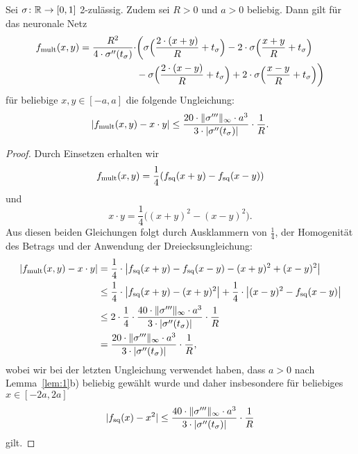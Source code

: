 \begin{lem}
  \label{lem:2}
  Sei $\sigma \colon \mathbb{R} \to [0, 1]$ 2-zulässig. Zudem sei $R > 0$ und $a > 0$ beliebig. Dann gilt für das neuronale Netz
  \begin{equation*}
  	\begin{split}
  	f_{\mathrm{mult}}(x, y) = \frac{R^2}{4 \cdot \sigma''(t_{\sigma})} \cdot & \bigg(\sigma\Big(\frac{2 \cdot (x + y)}{R} + t_{\sigma} \Big) - 2 \cdot \sigma\Big(\frac{x + y}{R} + t_{\sigma}\Big) \\
  	& - \sigma \Big(\frac{2 \cdot (x - y)}{R} + t_{\sigma} \Big) + 2 \cdot \sigma \Big(\frac{x - y}{R} + t_{\sigma} \Big) \bigg)
  	\end{split}
  	\end{equation*}
  	für beliebige $x, y \in [-a, a]$ die folgende Ungleichung:
  	$$|f_{\mathrm{mult}}(x, y) - x \cdot y| \leq \frac{20 \cdot \|\sigma'''\|_{\infty} \cdot a ^3}{3 \cdot |\sigma''(t_{\sigma})|} \cdot \frac{1}{R}.$$
  \end{lem}
  \begin{proof}
  Durch Einsetzen erhalten wir $$f_{\mathrm{mult}}(x,y) = \frac{1}{4}(f_{\mathrm{sq}}(x + y) - f_{\mathrm{sq}}(x - y))$$ und $$x \cdot y = \frac{1}{4}\big((x + y)^2 - (x - y)^2\big).$$
  Aus diesen beiden Gleichungen folgt durch Ausklammern von $\frac{1}{4}$, der Homogenität des Betrags und der Anwendung der Dreiecksungleichung:
  \begin{equation*}
  \begin{split}
  |f_{\mathrm{mult}}(x, y) - x \cdot y| & = \frac{1}{4} \cdot \big|f_{\mathrm{sq}}(x + y) - f_{\mathrm{sq}}(x - y) - (x + y)^2 + (x - y)^2\big| \\
  & \leq \frac{1}{4} \cdot \big|f_{\mathrm{sq}}(x + y) - (x + y)^2\big| + \frac{1}{4}\cdot\big| (x - y)^2 - f_{\mathrm{sq}}(x - y)\big| \\
  & \leq 2 \cdot \frac{1}{4} \cdot \frac{40 \cdot \|\sigma'''\|_{\infty} \cdot a^3}{3 \cdot |\sigma''(t_{\sigma})|} \cdot \frac{1}{R} \\
  & = \frac{20 \cdot \|\sigma'''\|_{\infty} \cdot a ^3}{3 \cdot |\sigma''(t_{\sigma})|} \cdot \frac{1}{R},
  \end{split}
\end{equation*}   
wobei wir bei der letzten Ungleichung verwendet haben, dass $a > 0$ nach Lemma~\ref{lem:1}b) beliebig gewählt wurde und daher insbesondere für beliebiges $x \in [-2a,2a]$ $$ |f_{\mathrm{sq}}(x) - x^2| \leq \frac{40 \cdot \|\sigma'''\|_{\infty} \cdot a^3}{3 \cdot |\sigma''(t_{\sigma})|} \cdot \frac{1}{R}$$ gilt. 
  \end{proof}
